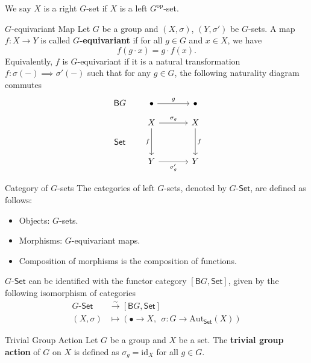 We say $X$ is a right $G$-set if $X$ is a left $G^{\mathrm{op}}$-set.

\begin{definition}{$G$-equivariant Map}{}
    Let $G$ be a group and $(X,\sigma)$, $(Y,\sigma')$ be $G$-sets. A map $f:X\to Y$ is called \textbf{$G$-equivariant} if for all $g\in G$ and $x\in X$, we have
    \[
        f(g\cdot x)=g\cdot f(x)    .
    \]
    Equivalently, $f$ is $G$-equivariant if it is a natural transformation $f:\sigma(-)\implies \sigma'(-)$ such that for any $g\in G$, the following naturality diagram commutes
    \[
        \begin{tikzcd}[ampersand replacement=\&, column sep=1.7em, row sep=small]
            \mathsf{B}G  \& \bullet \arrow[rr, "g"]                         \&  \& \bullet                 \\
            \& X \arrow[dd, "f"'] \arrow[rr, "\sigma_g"] \&  \& X \arrow[dd, "f"] \\
            \mathsf{Set} \&                                           \&  \&                   \\
            \& Y \arrow[rr, "\sigma'_g"']                \&  \& Y
        \end{tikzcd}
    \]
\end{definition}

\begin{definition}{Category of $G$-sets}{}
    The categories of left $G$-sets, denoted by $G\text{-}\mathsf{Set}$, are defined as follows:
    \begin{itemize}
        \item Objects: $G$-sets.
        \item Morphisms: $G$-equivariant maps.
        \item Composition of morphisms is the composition of functions.
    \end{itemize}
    $G\text{-}\mathsf{Set}$ can be identified with the functor category $[\mathsf{B}G,\mathsf{Set}]$, given by the following isomorphism of categories
\begin{align*}
    G\text{-}\mathsf{Set} & \stackrel{\sim}{\longrightarrow}[\mathsf{B}G, \mathsf{Set}] \\
    (X,\sigma )               & \longmapsto \left(\bullet \rightarrow X,\;\, \sigma:G\to \mathrm{Aut}_{\mathsf{Set}}(X)\right)
\end{align*}
    
\end{definition}


\begin{example}{Trivial Group Action}{}
    Let $G$ be a group and $X$ be a set. The \textbf{trivial group action} of $G$ on $X$ is defined as $\sigma_g=\mathrm{id}_X$ for all $g\in G$.
\end{example} 


